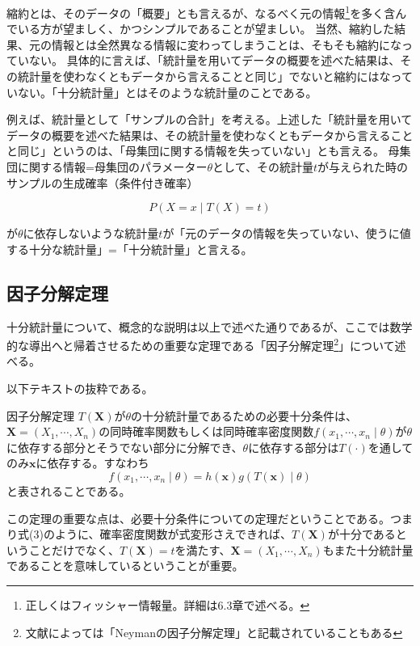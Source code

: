 \documentclass[a4paper,uplatex]{jsarticle}
\begin{document}
縮約とは、そのデータの「概要」とも言えるが、なるべく元の情報\footnote{正しくはフィッシャー情報量。詳細は6.3章で述べる。}を多く含んでいる方が望ましく、かつシンプルであることが望ましい。
当然、縮約した結果、元の情報とは全然異なる情報に変わってしまうことは、そもそも縮約になっていない。
具体的に言えば、「統計量を用いてデータの概要を述べた結果は、その統計量を使わなくともデータから言えることと同じ」でないと縮約にはなっていない。「十分統計量」とはそのような統計量のことである。

例えば、統計量として「サンプルの合計」を考える。上述した「統計量を用いてデータの概要を述べた結果は、その統計量を使わなくともデータから言えることと同じ」というのは、「母集団に関する情報を失っていない」とも言える。
母集団に関する情報=母集団のパラメーター$\theta$として、その統計量$t$が与えられた時のサンプルの生成確率（条件付き確率）

\begin{equation}
P(X = x \mid T(X) = t)
\end{equation}

が$\theta$に依存しないような統計量$t$が「元のデータの情報を失っていない、使うに値する十分な統計量」=「十分統計量」と言える。

\subsection{因子分解定理}
十分統計量について、概念的な説明は以上で述べた通りであるが、ここでは数学的な導出へと帰着させるための重要な定理である「因子分解定理\footnote{文献によっては「Neymanの因子分解定理」と記載されていることもある}」について述べる。

\vspace{\baselineskip}
以下テキストの抜粋である。

\begin{itembox}[c]{因子分解定理}
$T(\bm{X})$が$\theta$の十分統計量であるための必要十分条件は、$\bm{X} = (X_1,\cdots , X_n)$の同時確率関数もしくは同時確率密度関数$f(x_1, \cdots, x_n \mid \theta)$が$\theta$に依存する部分とそうでない部分に分解でき、$\theta$に依存する部分は$T(\cdot)$を通してのみ$\bm{x}$に依存する。すなわち
\begin{equation}
f(x_1, \cdots, x_n \mid \theta) = h(\bm{x})g(T(\bm{x}) \mid \theta)
\end{equation}
と表されることである。
\end{itembox}

この定理の重要な点は、必要十分条件についての定理だということである。つまり式(3)のように、確率密度関数が式変形さえできれば、$T(\bm{X})$が十分であるということだけでなく、$T(\bm{X})=t$を満たす、$\bm{X} = (X_1,\cdots , X_n)$もまた十分統計量であることを意味しているということが重要。
\end{document}
